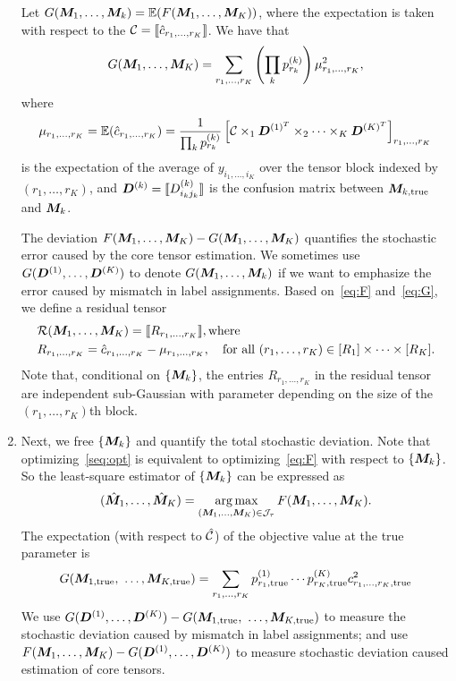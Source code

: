\documentclass{article}
\begin{document}
\begin{appendices}
\begin{enumerate}
Let $G(\bm M_1,\ldots,\bm M_k)=\mathbb{E}(F(\bm M_1,\ldots,\bm M_K))$, where the expectation is taken with respect to the $\mathcal{C}=\llbracket  \hat c_{r_1,\ldots,r_K} \rrbracket$. We have that  
\begin{equation}\label{eq:G}
G(\bm M_1,\ldots,\bm M_K)=\sum_{r_1,\ldots,r_K} \left(\prod_k p^{(k)}_{r_k}\right) \mu^2_{r_1,\ldots,r_K},
\end{equation}
where
\[
\mu_{r_1,\ldots,r_K}=\mathbb{E}(\hat c_{r_1,\ldots,r_K})={1\over \prod_k p^{(k)}_{r_k}}\left[ \mathcal{C}\times_1 \bm{D}^{(1)^T} \times_2\cdots\times_K \bm{D}^{(K)^T}\right]_{r_1,\ldots,r_K}
\]
is the expectation of the average of $y_{i_1,\ldots,i_K}$ over the tensor block indexed by $(r_1,\ldots,r_K)$, and $\bm{D}^{(k)}=\llbracket D^{(k)}_{i_kj_k} \rrbracket$ is the confusion matrix between $\bm M_{k,\text{true}}$ and $\bm M_k$.

The deviation $F(\bm M_1,\ldots,\bm M_K)-G(\bm M_1,\ldots,\bm M_K)$ quantifies the stochastic error caused by the core tensor estimation. We sometimes use $G(\bm{D}^{(1)},\ldots,\bm{D}^{(K)})$ to denote $G(\bm M_1,\ldots,\bm M_k)$ if we want to emphasize the error caused by mismatch in label assignments. 
Based on~\eqref{eq:F} and~\eqref{eq:G}, we define a residual tensor 
\begin{align}\label{eq:residual}
&\mathcal{R}(\bm M_1,\ldots,\bm M_K)=\llbracket R_{r_1,\ldots,r_K} \rrbracket,\text{where}\\
&R_{r_1,\ldots,r_K}= \hat c_{r_1,\ldots,r_K}-\mu_{r_1,\ldots,r_K} ,\quad \text{for all }(r_1,\ldots,r_K)\in[R_1]\times\cdots\times[R_K].
\end{align}
Note that, conditional on $\{\bm M_k\}$, the entries $R_{r_1,\ldots,r_K}$ in the residual tensor are independent sub-Gaussian with parameter depending on the size of the $(r_1,\ldots,r_K)$th block. 


\item Next, we free $\{\bm M_k\}$ and quantify the total stochastic deviation. Note that optimizing~\eqref{seq:opt} is equivalent to optimizing~\eqref{eq:F} with respect to $\{\bm M_k\}$. So the least-square estimator of $\{\bm M_k\}$ can be expressed as
\begin{equation}
   (\hat{\bm M}_1,\ldots,\hat{\bm M}_K) = \displaystyle\operatorname*{arg\,max}_{(\bm M_1,\ldots,\bm M_K)\in \mathcal{J}_\tau}F(\bm M_1,\ldots,\bm M_K).
\end{equation}
The expectation (with respect to $\hat {\mathcal{C}}$) of the objective value at the true parameter is
\[
G(\mM_{1,\text{true}},\ \ldots,\mM_{K,\text{true}})=\sum_{r_1,\ldots,r_K} p^{(1)}_{r_1,\text{true}} \cdots p^{(K)}_{r_K,\text{true}}c^2_{r_1,\ldots,r_K,\text{true}}
\]
We use $ G(\mD^{(1)},\ldots,\mD^{(K)})-G(\mM_{1,\text{true}},\ \ldots,\mM_{K,\text{true}})$ to measure the stochastic deviation caused by mismatch in label assignments; and use $F(\bm M_1,\ldots,\bm M_K)-G(\bm{D}^{(1)},\ldots,\bm{D}^{(K)})$ to measure stochastic deviation caused estimation of core tensors.  



\end{enumerate}
\end{appendices}
\end{document}

